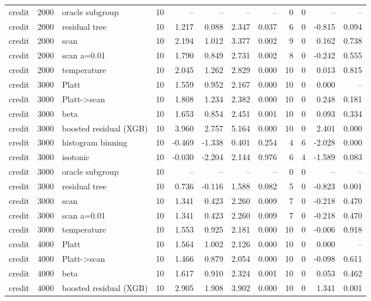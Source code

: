 \begin{tabular}{lllrrrrrrrrr}
credit & 2000 & oracle subgroup & 10 & -- & -- & -- & -- & 0 & 0 & -- & -- \\
credit & 2000 & residual tree & 10 & 1.217 & 0.088 & 2.347 & 0.037 & 6 & 0 & -0.815 & 0.094 \\
credit & 2000 & scan & 10 & 2.194 & 1.012 & 3.377 & 0.002 & 9 & 0 & 0.162 & 0.738 \\
credit & 2000 & scan a=0.01 & 10 & 1.790 & 0.849 & 2.731 & 0.002 & 8 & 0 & -0.242 & 0.555 \\
credit & 2000 & temperature & 10 & 2.045 & 1.262 & 2.829 & 0.000 & 10 & 0 & 0.013 & 0.815 \\
credit & 3000 & Platt & 10 & 1.559 & 0.952 & 2.167 & 0.000 & 10 & 0 & 0.000 & -- \\
credit & 3000 & Platt->scan & 10 & 1.808 & 1.234 & 2.382 & 0.000 & 10 & 0 & 0.248 & 0.181 \\
credit & 3000 & beta & 10 & 1.653 & 0.854 & 2.451 & 0.001 & 10 & 0 & 0.093 & 0.334 \\
credit & 3000 & boosted residual (XGB) & 10 & 3.960 & 2.757 & 5.164 & 0.000 & 10 & 0 & 2.401 & 0.000 \\
credit & 3000 & histogram binning & 10 & -0.469 & -1.338 & 0.401 & 0.254 & 4 & 6 & -2.028 & 0.000 \\
credit & 3000 & isotonic & 10 & -0.030 & -2.204 & 2.144 & 0.976 & 6 & 4 & -1.589 & 0.083 \\
credit & 3000 & oracle subgroup & 10 & -- & -- & -- & -- & 0 & 0 & -- & -- \\
credit & 3000 & residual tree & 10 & 0.736 & -0.116 & 1.588 & 0.082 & 5 & 0 & -0.823 & 0.001 \\
credit & 3000 & scan & 10 & 1.341 & 0.423 & 2.260 & 0.009 & 7 & 0 & -0.218 & 0.470 \\
credit & 3000 & scan a=0.01 & 10 & 1.341 & 0.423 & 2.260 & 0.009 & 7 & 0 & -0.218 & 0.470 \\
credit & 3000 & temperature & 10 & 1.553 & 0.925 & 2.181 & 0.000 & 10 & 0 & -0.006 & 0.918 \\
credit & 4000 & Platt & 10 & 1.564 & 1.002 & 2.126 & 0.000 & 10 & 0 & 0.000 & -- \\
credit & 4000 & Platt->scan & 10 & 1.466 & 0.879 & 2.054 & 0.000 & 10 & 0 & -0.098 & 0.611 \\
credit & 4000 & beta & 10 & 1.617 & 0.910 & 2.324 & 0.001 & 10 & 0 & 0.053 & 0.462 \\
credit & 4000 & boosted residual (XGB) & 10 & 2.905 & 1.908 & 3.902 & 0.000 & 10 & 0 & 1.341 & 0.001 \\

\end{tabular}
